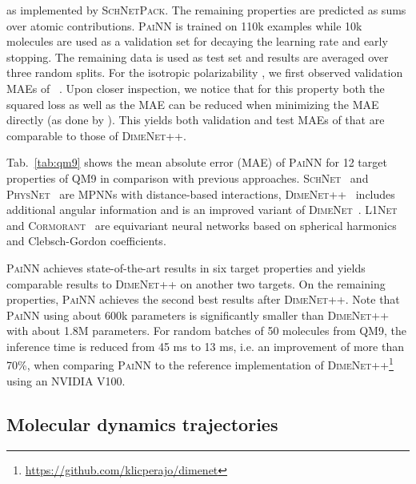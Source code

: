 \documentclass[reprint,
amsmath,amssymb,
 aip,jcp
]{revtex4-2}
\newcommand{\painn}{\textsc{PaiNN}}
\begin{document}
as implemented by \textsc{SchNetPack}.
The remaining properties are predicted as sums over atomic contributions.
\painn{} is trained on 110k examples while 10k molecules are used as a validation set for decaying the learning rate and early stopping. 
The remaining data is used as test set and results are averaged over three random splits.
For the isotropic polarizability , we first observed validation MAEs of ~.
Upon closer inspection, we notice that for this property both the squared loss as well as the MAE can be reduced when minimizing the MAE directly (as done by \citet{klicpera2020fast}).
This yields both validation and test MAEs of  that are comparable to those of \textsc{DimeNet++}.

Tab.~\ref{tab:qm9} shows the mean absolute error (MAE) of \painn{} for 12 target properties of QM9 in comparison with previous approaches.
\textsc{SchNet}~\cite{schutt2017schnet} and \textsc{PhysNet}~\cite{unke2019physnet} are MPNNs with distance-based interactions, \textsc{DimeNet}++~\cite{klicpera2020fast} includes additional angular information and is an improved variant of \textsc{DimeNet}~\cite{klicpera2020directional}. \textsc{L1Net}~\cite{miller2020relevance} and \textsc{Cormorant}~\cite{anderson2019cormorant} are equivariant neural networks based on spherical harmonics and Clebsch-Gordon coefficients.

\painn{} achieves state-of-the-art results in six target properties and yields comparable results to \textsc{DimeNet}++ on another two targets.
On the remaining properties, \painn{} achieves the second best results after \textsc{DimeNet}++.
Note that \painn{} using about 600k parameters is significantly smaller than \textsc{DimeNet}++ with about 1.8M parameters.
For random batches of 50 molecules from QM9, the inference time is reduced from 45 ms to 13 ms, i.e. an improvement of more than 70\%, when comparing \painn{} to the reference implementation of \textsc{DimeNet}++\footnote{\url{https://github.com/klicperajo/dimenet}} using an NVIDIA V100.

\subsection{Molecular dynamics trajectories}
\end{document}
